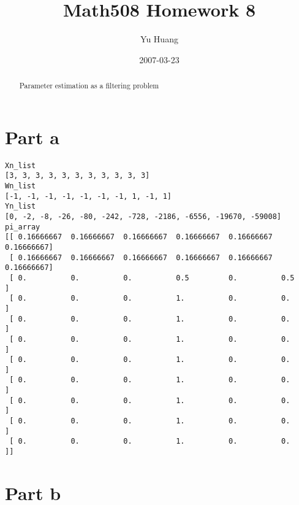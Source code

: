 \documentclass[a4paper,10pt]{article}
\title{Math508 Homework 8}
\author{Yu Huang}
\date{2007-03-23}
\begin{document}
\maketitle

\begin{abstract}
Parameter estimation as a filtering problem
\end{abstract}

\section{Part a}

\begin{verbatim}
Xn_list
[3, 3, 3, 3, 3, 3, 3, 3, 3, 3, 3]
Wn_list
[-1, -1, -1, -1, -1, -1, -1, 1, -1, 1]
Yn_list
[0, -2, -8, -26, -80, -242, -728, -2186, -6556, -19670, -59008]
pi_array
[[ 0.16666667  0.16666667  0.16666667  0.16666667  0.16666667  0.16666667]
 [ 0.16666667  0.16666667  0.16666667  0.16666667  0.16666667  0.16666667]
 [ 0.          0.          0.          0.5         0.          0.5       ]
 [ 0.          0.          0.          1.          0.          0.        ]
 [ 0.          0.          0.          1.          0.          0.        ]
 [ 0.          0.          0.          1.          0.          0.        ]
 [ 0.          0.          0.          1.          0.          0.        ]
 [ 0.          0.          0.          1.          0.          0.        ]
 [ 0.          0.          0.          1.          0.          0.        ]
 [ 0.          0.          0.          1.          0.          0.        ]
 [ 0.          0.          0.          1.          0.          0.        ]]
\end{verbatim}


\section{Part b}
\end{document}
